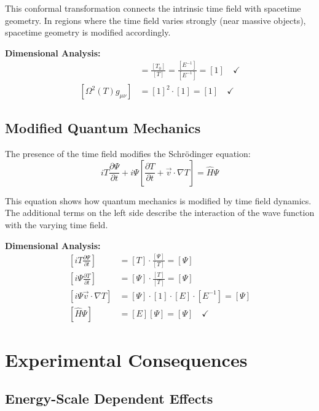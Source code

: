 \documentclass[12pt,a4paper]{report}
\begin{document}
	This conformal transformation connects the intrinsic time field with spacetime geometry. In regions where the time field varies strongly (near massive objects), spacetime geometry is modified accordingly.
	
	\textbf{Dimensional Analysis:}
	\begin{align}
		[\Omega(T)] &= \frac{[T_0]}{[T]} = \frac{[E^{-1}]}{[E^{-1}]} = [1] \quad \checkmark \\
		[\Omega^2(T) g_{\mu\nu}] &= [1]^2 \cdot [1] = [1] \quad \checkmark
	\end{align}
	
	\subsection{Modified Quantum Mechanics}\label{subsec:modified_quantum_mechanics}
	
	The presence of the time field modifies the Schrödinger equation:
	\begin{equation}
		i T \frac{\partial\Psi}{\partial t} + i\Psi\left[\frac{\partial T}{\partial t} + \vec{v} \cdot \nabla T\right] = \hat{H}\Psi
		\label{eq:modified_schrodinger}
	\end{equation}
	
	This equation shows how quantum mechanics is modified by time field dynamics. The additional terms on the left side describe the interaction of the wave function with the varying time field.
	
	\textbf{Dimensional Analysis:}
	\begin{align}
		\left[i T \frac{\partial\Psi}{\partial t}\right] &= [T] \cdot \frac{[\Psi]}{[T]} = [\Psi] \\
		\left[i\Psi\frac{\partial T}{\partial t}\right] &= [\Psi] \cdot \frac{[T]}{[T]} = [\Psi] \\
		\left[i\Psi\vec{v} \cdot \nabla T\right] &= [\Psi] \cdot [1] \cdot [E] \cdot [E^{-1}] = [\Psi] \\
		[\hat{H}\Psi] &= [E][\Psi] = [\Psi] \quad \checkmark
	\end{align}
	
	\section{Experimental Consequences}\label{sec:experimental_consequences}
	
	\subsection{Energy-Scale Dependent Effects}\label{subsec:energy_scale_effects}
	
\end{document}
